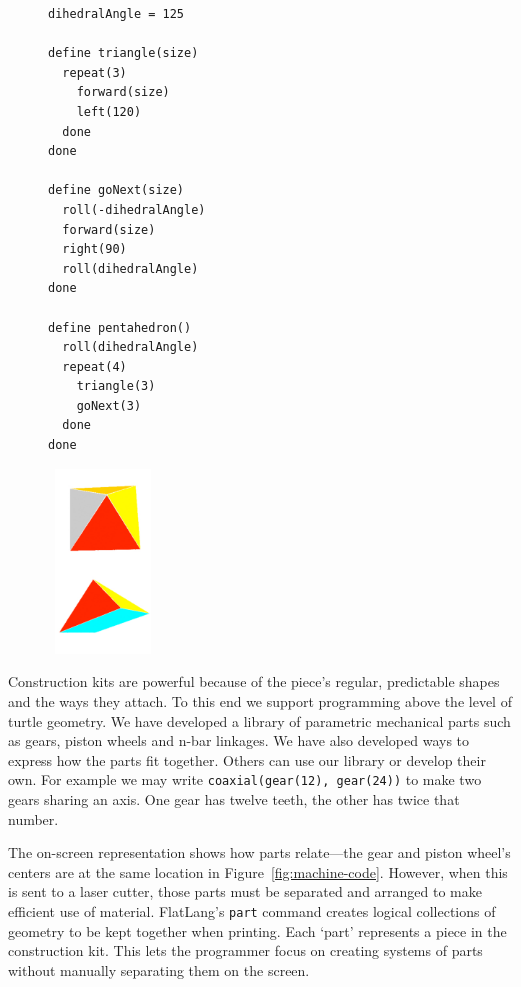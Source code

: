 \documentclass[times, 10pt,twocolumn]{article}
\makeatletter
\newenvironment{subfloat}%
{\def\caption##1{\gdef\subcapsave{\relax##1}}%
\let\subcapsave=\@empty %
\let\sf@oldlabel=\label 
\def\label##1{\xdef\sublabsave{\noexpand\label{##1}}}%
\let\sublabsave\relax %
\setbox\subfigbox\hbox 
\bgroup}%
{\egroup %
\let\label=\sf@oldlabel 
\subfigure[\subcapsave]{\box\subfigbox}}%
\makeatother
\begin{document}
\begin{figure}
  \centering 
  \begin{subfloat}%
    \begin{minipage}{1.8in} 
      \footnotesize
\begin{verbatim}
dihedralAngle = 125

define triangle(size)
  repeat(3)
    forward(size)
    left(120)
  done
done

define goNext(size)
  roll(-dihedralAngle)
  forward(size)
  right(90)
  roll(dihedralAngle)
done

define pentahedron()
  roll(dihedralAngle)
  repeat(4)
    triangle(3)
    goNext(3)
  done
done
\end{verbatim}

    \end{minipage}%
  \end{subfloat} 
  \begin{minipage}{1.0in}
    \begin{subfloat}
      \includegraphics[width=1.0in]{pentahedron.pdf}
    \end{subfloat}
  \end{minipage}
  \caption{Low-level \nohyphens{FlatLang} and graphics for a
    pentahedron.}
    \label{fig:pentahedron}
\end{figure} 

Construction kits are powerful because of the piece's regular,
predictable shapes and the ways they attach. To this end we support
programming above the level of turtle geometry. We have developed a
library of parametric mechanical parts such as gears, piston wheels
and n-bar linkages. We have also developed ways to express how the
parts fit together. Others can use our library or develop their
own. For example we may write \textnhtt{coaxial(gear(12),~gear(24))}
to make two gears sharing an axis. One gear has twelve teeth, the
other has twice that number.

The on-screen representation shows how parts relate---the gear and
piston wheel's centers are at the same location in
Figure~\ref{fig:machine-code}. However, when this is sent to a laser
cutter, those parts must be separated and arranged to make efficient
use of material. \nohyphens{FlatLang's} \textnhtt{part} command
creates logical collections of geometry to be kept together when
printing. Each `part' represents a piece in the construction kit. This
lets the programmer focus on creating systems of parts without
manually separating them on the screen.
\end{document}
